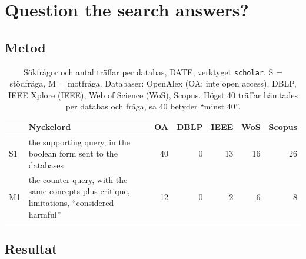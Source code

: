 \chapter{Question the search answers?}
\label{app:claim}


\section{Metod}
\label{sec:claim-metod}


\begin{table}[!htb]
  \caption{Sökfrågor och antal träffar per databas, DATE, verktyget
    \texttt{scholar}.  S = stödfråga, M = motfråga.  Databaser: OpenAlex
    (OA; inte \foreignlanguage{english}{open access}), DBLP, IEEE Xplore
    (IEEE), Web of Science (WoS), Scopus.  Högst 40 träffar hämtades per
    databas och fråga, så 40 betyder \enquote{minst 40}.}%
  \label{tab:sok-queries-claim}
  \centering\footnotesize
  \begin{tabularx}{\linewidth}{@{}l>{\raggedright\arraybackslash}X rrrrr@{}}
    \toprule
       & Nyckelord & OA & DBLP & IEEE & WoS & Scopus \\
    \midrule
    S1 & the supporting query, in the boolean form sent to the databases
       & 40 & 0 & 13 & 16 & 26 \\
    \midrule
    M1 & the counter-query, with the same concepts plus critique,
         limitations, \enquote{considered harmful}
       & 12 & 0 & 2 & 6 & 8 \\
    \bottomrule
  \end{tabularx}
\end{table}


\section{Resultat}
\label{sec:claim-resultat}

